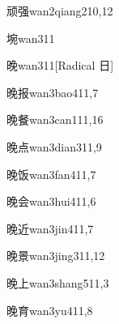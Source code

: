\begin{verbete}{顽强}{wan2qiang2}{10,12}
\end{verbete}

\begin{verbete}{埦}{wan3}{11}
\end{verbete}

\begin{verbete}{晚}{wan3}{11}[Radical 日]
\end{verbete}

\begin{verbete}{晚报}{wan3bao4}{11,7}
\end{verbete}

\begin{verbete}{晚餐}{wan3can1}{11,16}
\end{verbete}

\begin{verbete}{晚点}{wan3dian3}{11,9}
\end{verbete}

\begin{verbete}{晚饭}{wan3fan4}{11,7}
\end{verbete}

\begin{verbete}{晚会}{wan3hui4}{11,6}
\end{verbete}

\begin{verbete}{晚近}{wan3jin4}{11,7}
\end{verbete}

\begin{verbete}{晚景}{wan3jing3}{11,12}
\end{verbete}

\begin{verbete}{晚上}{wan3shang5}{11,3}
\end{verbete}

\begin{verbete}{晚育}{wan3yu4}{11,8}
\end{verbete}

